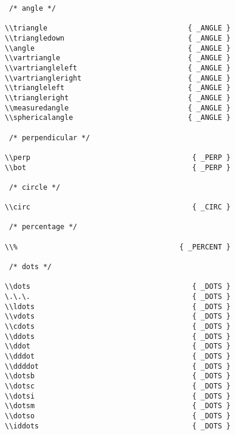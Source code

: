 \begin{verbatim}
 /* angle */

\\triangle                                 { _ANGLE }
\\triangledown                             { _ANGLE }
\\angle                                    { _ANGLE }
\\vartriangle                              { _ANGLE }
\\vartriangleleft                          { _ANGLE }
\\vartriangleright                         { _ANGLE }
\\triangleleft                             { _ANGLE }
\\triangleright                            { _ANGLE }
\\measuredangle                            { _ANGLE }
\\sphericalangle                           { _ANGLE }

 /* perpendicular */

\\perp                                      { _PERP }
\\bot                                       { _PERP }

 /* circle */

\\circ                                      { _CIRC }

 /* percentage */

\\%                                      { _PERCENT }

 /* dots */

\\dots                                      { _DOTS }
\.\.\.                                      { _DOTS }
\\ldots                                     { _DOTS }
\\vdots                                     { _DOTS }
\\cdots                                     { _DOTS }
\\ddots                                     { _DOTS }
\\ddot                                      { _DOTS }
\\dddot                                     { _DOTS }
\\ddddot                                    { _DOTS }
\\dotsb                                     { _DOTS }
\\dotsc                                     { _DOTS }
\\dotsi                                     { _DOTS }
\\dotsm                                     { _DOTS }
\\dotso                                     { _DOTS }
\\iddots                                    { _DOTS }


\end{verbatim}
